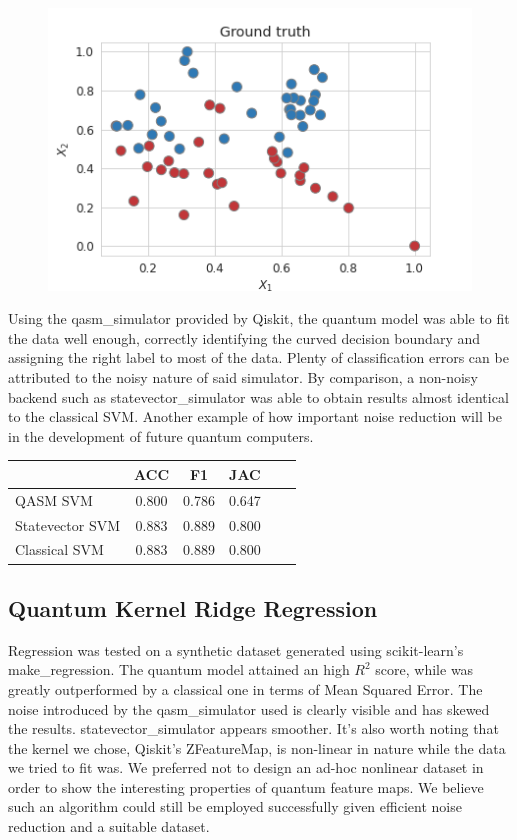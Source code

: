 \documentclass{article}
\begin{document}
\begin{multicols}{2}
\begin{figure}[H]
    \includegraphics[width=\linewidth]{assets/svm/gt.png}
\end{figure}
Using the qasm\_simulator provided by Qiskit, the quantum model was able to fit the data well enough, correctly identifying the curved decision boundary and assigning the right label to most of the data. Plenty of classification errors can be attributed to the noisy nature of said simulator. By comparison, a non-noisy backend such as statevector\_simulator was able to obtain results almost identical to the classical SVM. Another example of how important noise reduction will be in the development of future quantum computers.

\begin{center}
\begin{tabular}{lccccl}
\toprule
  & ACC    & F1  & JAC  \\
  \midrule
 QASM SVM & 0.800 & 0.786 & 0.647    \\
 Statevector SVM & 0.883 & 0.889 & 0.800    \\
 Classical SVM & 0.883 & 0.889 & 0.800   \\
\bottomrule
\end{tabular}
\end{center}

\subsection{Quantum Kernel Ridge Regression}
Regression was tested on a synthetic dataset generated using scikit-learn's make\_regression. The quantum model attained an high $R^2$ score, while was greatly outperformed by a classical one in terms of Mean Squared Error. The noise introduced by the qasm\_simulator used is clearly visible and has skewed the results. statevector\_simulator appears smoother. It's also worth noting that the kernel we chose, Qiskit's ZFeatureMap, is non-linear in nature while the data we tried to fit was. We preferred not to design an ad-hoc nonlinear dataset in order to show the interesting properties of quantum feature maps. We believe such an algorithm could still be employed successfully given efficient noise reduction and a suitable dataset.


\end{multicols}
\end{document}
